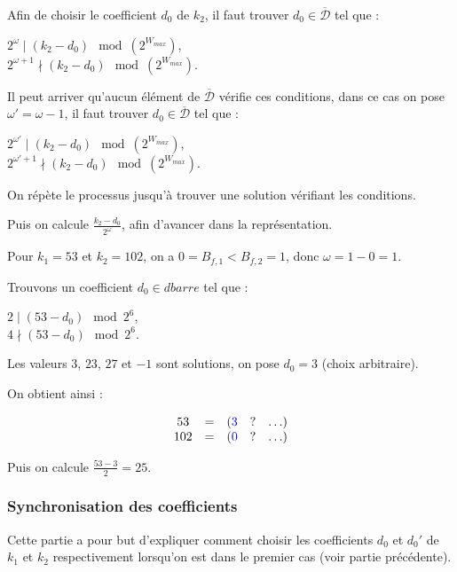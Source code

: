 \documentclass[12pt, a4paper]{memoir}
\newcommand{\dbarre}{\overline{\mathcal{D}}}
\begin{document}
   Afin de choisir le coefficient $d_0$ de $k_2$, il faut trouver $d_0 \in \dbarre$ tel que :
   \begin{center}
    $2^{\omega} \mid (k_2 - d_0) \mod (2^{W_{max}})$, \\
    $2^{\omega+1} \nmid (k_2 - d_0) \mod (2^{W_{max}})$.
   \end{center}
 
 Il peut arriver qu'aucun élément de $\dbarre$ vérifie ces conditions, dans ce cas on pose $\omega' = \omega - 1$, 
 il faut trouver $d_0 \in \dbarre$ tel que :
 \begin{center}
    $2^{\omega'} \mid (k_2 - d_0) \mod (2^{W_{max}})$, \\
    $2^{\omega'+1} \nmid (k_2 - d_0) \mod (2^{W_{max}})$.
 \end{center}
 
 On répète le processus jusqu'à trouver une solution vérifiant les conditions.
 
 Puis on calcule $\frac{k_2 - d_0}{2^{\omega}}$, afin d'avancer dans la représentation.
 
 \begin{Exemple}
  Pour $k_1 = 53$ et $k_2 = 102$, on a $0 = B_{f,1} < B_{f,2} = 1$, donc $\omega = 1 - 0 = 1$.
  
  Trouvons un coefficient $d_0 \in dbarre$ tel que :
  \begin{center}
   $2 \mid (53 - d_0) \mod 2^6$, \\
   $4 \nmid (53 - d_0) \mod 2^6$.
  \end{center}
  
  Les valeurs $3$, $23$, $27$ et $-1$ sont solutions, on pose $d_0 = 3$ (choix arbitraire).
  
  On obtient ainsi :
  
     $$\begin{array}{ccccc}
  53 & = & (\textcolor{blue}{3} & ? & \ldots) \\
  102 & = & (\textcolor{blue}{0} & ? & \ldots)
 \end{array}$$
 
 Puis on calcule $\frac{53 - 3}{2} = 25$.
 \end{Exemple}

  \subsubsection{Synchronisation des coefficients}
 
 Cette partie a pour but d'expliquer comment choisir les coefficients $d_0$ et $d_0'$ de $k_1$ et $k_2$ respectivement
 lorsqu'on est dans le premier cas (voir partie précédente).
 
\end{document}
